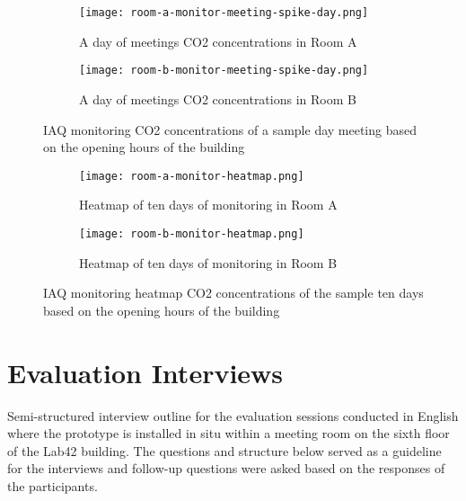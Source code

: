 \begin{appendices}
\begin{figure}[htbp]
    \centering
    \begin{subfigure}{0.46\textwidth}
        \centering
        \texttt{[image: room-a-monitor-meeting-spike-day.png]}
        \caption{A day of meetings CO2 concentrations in Room A}
        \label{fig:monitor-multiple-a}
    \end{subfigure}
    \hfill
    \begin{subfigure}{0.46\textwidth}
        \centering
        \texttt{[image: room-b-monitor-meeting-spike-day.png]}
        \caption{A day of meetings CO2 concentrations in Room B}
        \label{fig:monitor-multiple-b}
    \end{subfigure}
    \caption{IAQ monitoring CO2 concentrations of a sample day meeting based on the opening hours of the building}
    \label{fig:monitoring-multiple}
\end{figure}

\begin{figure}[htbp]
    \centering
    \begin{subfigure}{0.46\textwidth}
        \centering
        \texttt{[image: room-a-monitor-heatmap.png]}
        \caption{Heatmap of ten days of monitoring in Room A}
        \label{fig:monitor-heatmap-a}
    \end{subfigure}
    \hfill
    \begin{subfigure}{0.46\textwidth}
        \centering
        \texttt{[image: room-b-monitor-heatmap.png]}
        \caption{Heatmap of ten days of monitoring in Room B}
        \label{fig:monitor-heatmap-b}
    \end{subfigure}
    \caption{IAQ monitoring heatmap CO2 concentrations of the sample ten days based on the opening hours of the building}
    \label{fig:monitoring-heatmap}
\end{figure}

\newpage

\section{Evaluation Interviews}
\label{appendix:evaluation}

Semi-structured interview outline for the evaluation sessions conducted in English where the prototype is installed in situ within a meeting room on the sixth floor of the Lab42 building. The questions and structure below served as a guideline for the interviews and follow-up questions were asked based on the responses of the participants.


\end{appendices}
